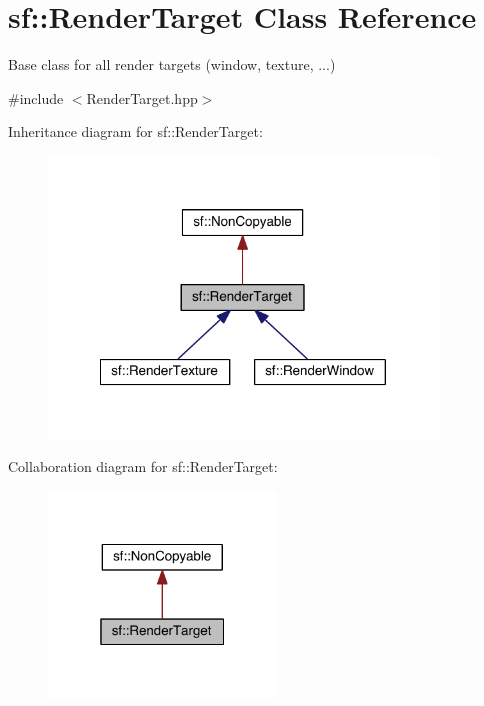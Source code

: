 \hypertarget{classsf_1_1_render_target}{\section{sf\-:\-:Render\-Target Class Reference}
\label{classsf_1_1_render_target}
}


Base class for all render targets (window, texture, ...)  




{\ttfamily \#include $<$Render\-Target.\-hpp$>$}



Inheritance diagram for sf\-:\-:Render\-Target\-:
\nopagebreak
\begin{figure}[H]
\begin{center}
\leavevmode
\includegraphics[width=293pt]{classsf_1_1_render_target__inherit__graph}
\end{center}
\end{figure}


Collaboration diagram for sf\-:\-:Render\-Target\-:
\nopagebreak
\begin{figure}[H]
\begin{center}
\leavevmode
\includegraphics[width=172pt]{classsf_1_1_render_target__coll__graph}
\end{center}
\end{figure}
